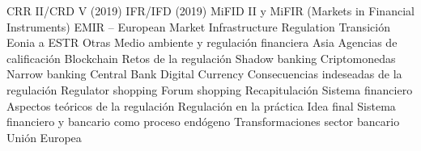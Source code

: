 \documentclass{nuevotema}
\begin{document}
\begin{esquema}[enumerate]
			\3 CRR II/CRD V (2019)
			\3 IFR/IFD (2019)
			\3 MiFID II y MiFIR (Markets in Financial Instruments)
			\3 EMIR -- European Market Infrastructure Regulation
			\3 Transición Eonia a ESTR
		\2 Otras
			\3 Medio ambiente y regulación financiera
			\3 Asia
			\3 Agencias de calificación
			\3 Blockchain
		\2 Retos de la regulación
			\3 Shadow banking
			\3 Criptomonedas
			\3 Narrow banking
			\3 Central Bank Digital Currency
			\3 Consecuencias indeseadas de la regulación
			\3 Regulator shopping
			\3 Forum shopping
	\1[] 
		\2 Recapitulación
			\3 Sistema financiero
			\3 Aspectos teóricos de la regulación
			\3 Regulación en la práctica
		\2 Idea final
			\3 Sistema financiero y bancario como proceso endógeno
			\3 Transformaciones sector bancario
			\3 Unión Europea

\end{esquema}

\esquemalargo
\end{document}
